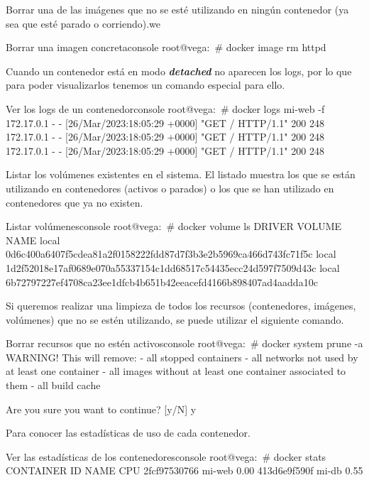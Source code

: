 Borrar una de las imágenes que no se esté utilizando en ningún contenedor (ya sea que esté parado o corriendo).we

\begin{mycode}{Borrar una imagen concreta}{console}{}
root@vega:~# docker image rm httpd
\end{mycode}


Cuando un contenedor está en modo \textit{\textbf{detached}} no aparecen los logs, por lo que para poder visualizarlos tenemos un comando especial para ello.
\begin{mycode}{Ver los logs de un contenedor}{console}{}
root@vega:~# docker logs mi-web -f
172.17.0.1 - - [26/Mar/2023:18:05:29 +0000] "GET / HTTP/1.1" 200 248
172.17.0.1 - - [26/Mar/2023:18:05:29 +0000] "GET / HTTP/1.1" 200 248
172.17.0.1 - - [26/Mar/2023:18:05:29 +0000] "GET / HTTP/1.1" 200 248
\end{mycode}


Listar los volúmenes existentes en el sistema. El listado muestra los que se están utilizando en contenedores (activos o parados) o los que se han utilizado en contenedores que ya no existen.

\begin{mycode}{Listar volúmenes}{console}{{\small}}
root@vega:~# docker volume ls
DRIVER    VOLUME NAME
local     0d6c400a6407f5cdea81a2f0158222fdd87d7f3b3e2b5969ca466d743fc71f5c
local     1d2f52018e17af0689e070a55337154c1dd68517c54435ecc24d597f7509d43c
local     6b72797227ef4708ca23ee1dfcb4b651b42eeacefd4166b898407ad4aadda10c
\end{mycode}


Si queremos realizar una limpieza de todos los recursos (contenedores, imágenes,  volúmenes) que no se estén utilizando, se puede utilizar el siguiente comando.
\begin{mycode}{Borrar recursos que no estén activos}{console}{}
root@vega:~# docker system prune -a
WARNING! This will remove:
- all stopped containers
- all networks not used by at least one container
- all images without at least one container associated to them
- all build cache

Are you sure you want to continue? [y/N] y
\end{mycode}



Para conocer las estadísticas de uso de cada contenedor.
\begin{mycode}{Ver las estadísticas de los contenedores}{console}{{\scriptsize }}
root@vega:~# docker stats
CONTAINER ID  NAME    CPU %
2fcf97530766  mi-web  0.00%
413d6e9f590f  mi-db   0.55%
\end{mycode}


